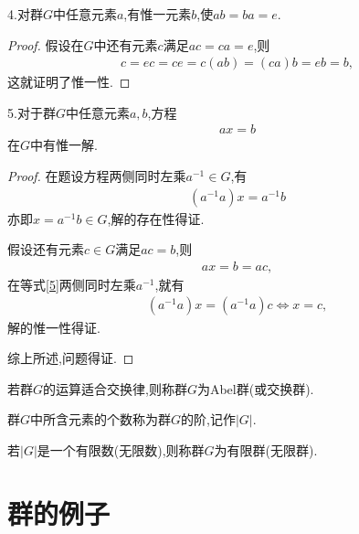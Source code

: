 4.对群$G$中任意元素$a$,有惟一元素$b$,使$ab=ba=e$.\begin{proof}
    假设在$G$中还有元素$c$满足$ac=ca=e$,则\begin{align*}
        c=ec=ce=c(ab)=(ca)b=eb=b,
    \end{align*}这就证明了惟一性.
\end{proof}

5.对于群$G$中任意元素$a,b$,方程\begin{align*}
    ax=b
\end{align*}在$G$中有惟一解.\begin{proof}
    在题设方程两侧同时左乘$a^{-1}\in G$,有\begin{align*}
        (a^{-1}a)x=a^{-1}b
    \end{align*}亦即$x=a^{-1}b\in G$,解的存在性得证.

    假设还有元素$c\in G$满足$ac=b$,则\begin{align}
        ax=b=ac,\label{5}
    \end{align}在等式\eqref{5}两侧同时左乘$a^{-1}$,就有\begin{align*}
        (a^{-1}a)x=(a^{-1}a)c\iff x=c,
    \end{align*}解的惟一性得证.

    综上所述,问题得证.
\end{proof}

\begin{definition}
    若群$G$的运算适合交换律,则称群$G$为Abel群(或交换群).
\end{definition}

\begin{definition}[阶]
    群$G$中所含元素的个数称为群$G$的阶,记作$|G|$.
\end{definition}

\begin{definition}[有限群与无限群]
    若$|G|$是一个有限数(无限数),则称群$G$为有限群(无限群).
\end{definition}
\section{群的例子}
\stars
